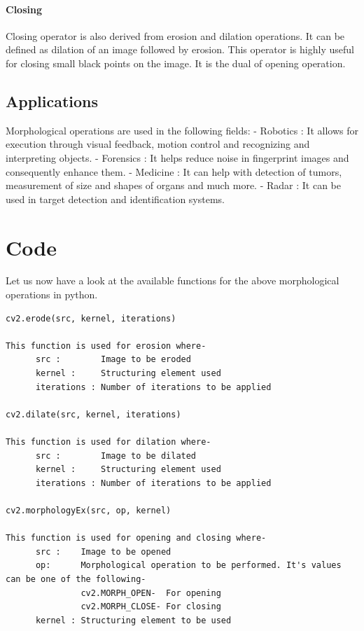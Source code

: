 \documentclass[]{article}
\let\oldparagraph\paragraph
\renewcommand{\paragraph}[1]{\oldparagraph{#1}\mbox{}}
\begin{document}
\paragraph{Closing}\label{closing}

Closing operator is also derived from erosion and dilation operations.
It can be defined as dilation of an image followed by erosion. This
operator is highly useful for closing small black points on the image.
It is the dual of opening operation.

\subsection{Applications}\label{applications}

Morphological operations are used in the following fields: - Robotics :
It allows for execution through visual feedback, motion control and
recognizing and interpreting objects. - Forensics : It helps reduce
noise in fingerprint images and consequently enhance them. - Medicine :
It can help with detection of tumors, measurement of size and shapes of
organs and much more. - Radar : It can be used in target detection and
identification systems.

\section{Code}\label{code}

Let us now have a look at the available functions for the above
morphological operations in python.

\begin{verbatim}
cv2.erode(src, kernel, iterations)

This function is used for erosion where-
      src :        Image to be eroded
      kernel :     Structuring element used
      iterations : Number of iterations to be applied

cv2.dilate(src, kernel, iterations)

This function is used for dilation where-
      src :        Image to be dilated
      kernel :     Structuring element used
      iterations : Number of iterations to be applied

cv2.morphologyEx(src, op, kernel)

This function is used for opening and closing where-
      src :    Image to be opened
      op:      Morphological operation to be performed. It's values can be one of the following-
               cv2.MORPH_OPEN-  For opening
               cv2.MORPH_CLOSE- For closing
      kernel : Structuring element to be used
      
\end{verbatim}
\end{document}
